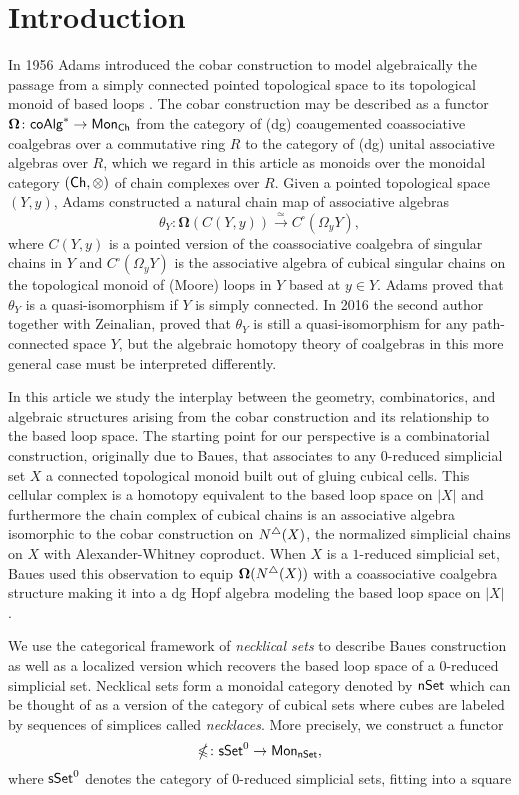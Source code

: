 \section{Introduction}
In 1956 Adams introduced the cobar construction to model algebraically the passage from a simply connected pointed topological space to its topological monoid of based loops \cite{Adams}. The cobar construction may be described as a functor $\mathbf{\Omega} \colon \mathsf{coAlg}^* \to \mathsf{Mon}_{\mathsf{Ch}}$ from the category of (dg) coaugemented coassociative coalgebras over a commutative ring $R$ to the category of (dg) unital associative algebras over $R$, which we regard in this article as monoids over the monoidal category $(\mathsf{Ch}, \otimes) $ of chain complexes over $R$. Given a pointed topological space $(Y,y)$, Adams constructed a natural chain map of associative algebras
$$\theta_Y \colon \mathbf{\Omega}(C(Y,y)) \xrightarrow{\simeq} C^{\square}(\Omega_yY),$$ where $C(Y,y)$ is a pointed version of the coassociative coalgebra of singular chains in $Y$ and $C^{\square}(\Omega_yY)$ is the associative algebra of cubical singular chains on the topological monoid of (Moore) loops in $Y$ based at $y \in Y$. Adams proved that $\theta_Y$ is a quasi-isomorphism if $Y$ is simply connected. In 2016 the second author together with Zeinalian, proved that $\theta_Y$ is still a quasi-isomorphism for any path-connected space $Y$, but the algebraic homotopy theory of coalgebras in this more general case must be interpreted differently.

In this article we study the interplay between the geometry, combinatorics, and algebraic structures arising from the cobar construction and its relationship to the based loop space. The starting point for our perspective is a combinatorial construction, originally due to Baues, that associates to any $0$-reduced simplicial set $X$ a connected topological monoid built out of gluing cubical cells.  This cellular complex is a homotopy equivalent to the based loop space on $|X|$ and furthermore the chain complex of cubical chains is an associative algebra isomorphic to the cobar construction on $N^{\triangle}(X)$, the normalized simplicial chains on $X$ with Alexander-Whitney coproduct. When $X$ is a $1$-reduced simplicial set, Baues used this observation to equip $\mathbf{\Omega}( N^{\triangle} (X) )$ with a coassociative coalgebra structure making it into a dg Hopf algebra modeling the based loop space on $|X|$ \cite{Baues}. 

We use the categorical framework of \textit{necklical sets} to describe Baues construction as well as a localized version which recovers the based loop space of a $0$-reduced simplicial set. Necklical sets form a monoidal category denoted by $\mathsf{nSet}$ which can be thought of as a version of the category of cubical sets where cubes are labeled by sequences of simplices called \textit{necklaces}. More precisely, we construct a functor $$\mathbb{\Omega} \colon \mathsf{sSet}^0 \to \mathsf{Mon}_{\mathsf{nSet}},$$ where $\mathsf{sSet}^0$ denotes the category of $0$-reduced simplicial sets, fitting into a square

